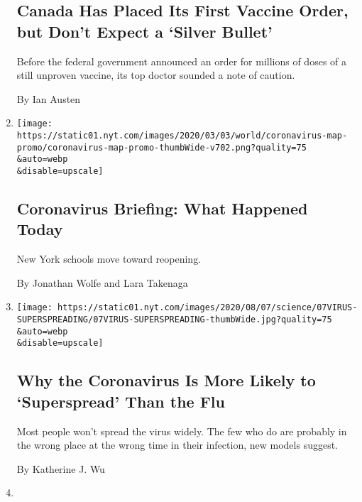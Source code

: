 \begin{enumerate}
  \hypertarget{canada-has-placed-its-first-vaccine-order-but-dont-expect-a-silver-bullet}{%
  \subsection{Canada Has Placed Its First Vaccine Order, but Don't
  Expect a `Silver
  Bullet'}\label{canada-has-placed-its-first-vaccine-order-but-dont-expect-a-silver-bullet}}

  Before the federal government announced an order for millions of doses
  of a still unproven vaccine, its top doctor sounded a note of caution.

  By Ian Austen
\item
  \href{/2020/08/07/us/coronavirus-today.html}{}

  \texttt{[image: https://static01.nyt.com/images/2020/03/03/world/coronavirus-map-promo/coronavirus-map-promo-thumbWide-v702.png?quality=75\\\&auto=webp\\\&disable=upscale]}

  \hypertarget{coronavirus-briefing-what-happened-today}{%
  \subsection{Coronavirus Briefing: What Happened
  Today}\label{coronavirus-briefing-what-happened-today}}

  New York schools move toward reopening.

  By Jonathan Wolfe and Lara Takenaga
\item
  \href{/2020/08/07/health/coronavirus-superspreading-contagion.html}{}

  \texttt{[image: https://static01.nyt.com/images/2020/08/07/science/07VIRUS-SUPERSPREADING/07VIRUS-SUPERSPREADING-thumbWide.jpg?quality=75\\\&auto=webp\\\&disable=upscale]}

  \hypertarget{why-the-coronavirus-is-more-likely-to-superspread-than-the-flu}{%
  \subsection{Why the Coronavirus Is More Likely to `Superspread' Than
  the
  Flu}\label{why-the-coronavirus-is-more-likely-to-superspread-than-the-flu}}

  Most people won't spread the virus widely. The few who do are probably
  in the wrong place at the wrong time in their infection, new models
  suggest.

  By Katherine J. Wu
\item
  \href{/2020/08/07/world/middleeast/lebanon-explosion-ship.html}{}


\end{enumerate}
